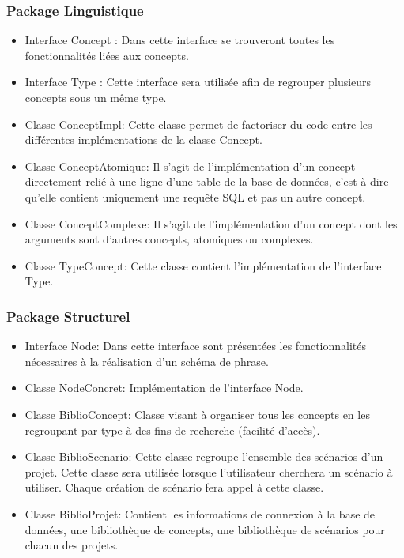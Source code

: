 \documentclass[12pt]{report}
\begin{document}
\subsubsection*{Package Linguistique}
\begin{itemize}
\item Interface Concept : Dans cette interface se trouveront toutes les fonctionnalités liées aux concepts.

\item Interface Type : Cette interface sera utilisée afin de regrouper plusieurs concepts sous un même type. 

\item Classe ConceptImpl: Cette classe permet de factoriser du code entre les différentes implémentations de la classe Concept.

\item Classe ConceptAtomique: Il s'agit de l'implémentation d'un concept directement relié à une ligne d'une table de la base de données, c'est à dire qu'elle contient uniquement une requête SQL et pas un autre concept.

\item Classe ConceptComplexe: Il s'agit de l'implémentation d'un concept dont les arguments sont d'autres concepts, atomiques ou complexes.

\item Classe TypeConcept: Cette classe contient l'implémentation de l'interface Type.
\end{itemize}

\subsubsection*{Package Structurel}
\begin{itemize}
\item Interface Node: Dans cette interface sont présentées les fonctionnalités nécessaires à la réalisation d'un schéma de phrase.

\item Classe NodeConcret: Implémentation de l'interface Node.

\item Classe BiblioConcept: Classe visant à organiser tous les concepts en les regroupant par type à des fins de recherche (facilité d'accès).

\item Classe BiblioScenario: Cette classe regroupe l'ensemble des scénarios d'un projet. Cette classe sera utilisée lorsque l'utilisateur cherchera un scénario à utiliser. Chaque création de scénario fera appel à cette classe.

\item Classe BiblioProjet: Contient les informations de connexion à la base de données, une bibliothèque de concepts, une bibliothèque de scénarios pour chacun des projets.
\end{itemize}
\end{document}
